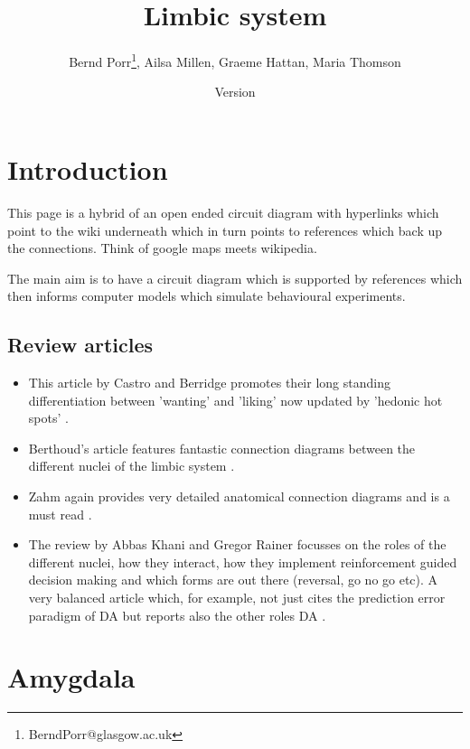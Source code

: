 \documentclass[12pt,a4paper]{article}
\title{Limbic system}
\author{Bernd Porr\footnote{BerndPorr@glasgow.ac.uk}, Ailsa Millen, Graeme Hattan, Maria Thomson}
\date{Version }
\let\oldsection\section
\renewcommand\section{\clearpage\oldsection}
\begin{document}
\maketitle

\ifx\HCode\undefined \else
{}
\fi


\section{Introduction}
This page is a hybrid of an open ended circuit diagram with hyperlinks which point to the wiki underneath which in turn points to references which back up the connections. Think of google maps meets wikipedia.

The main aim is to have a circuit diagram which is supported by references which then informs computer models which simulate behavioural experiments.


\subsection{Review articles}
\begin{itemize}
\item This article by Castro and Berridge promotes their long standing differentiation between 'wanting' and 'liking' \citep{Berridge2009} now updated by 'hedonic hot spots' \citep{Castro2015}.
\item Berthoud's article features fantastic connection diagrams between the different nuclei of the limbic system \citep{Berthoud04}.
\item Zahm again provides very detailed anatomical connection diagrams and is a must read \citep{Zahm00}.
\item The review by  Abbas Khani and Gregor Rainer focusses on the roles of the different nuclei, how they interact, how they implement reinforcement guided decision making and which forms are out there (reversal, go no go etc). A very balanced article which, for example, not just cites the prediction error paradigm of DA but reports also the other roles DA \citep{Khani2016}.
\end{itemize}

\tableofcontents










\section{Amygdala}
\end{document}
